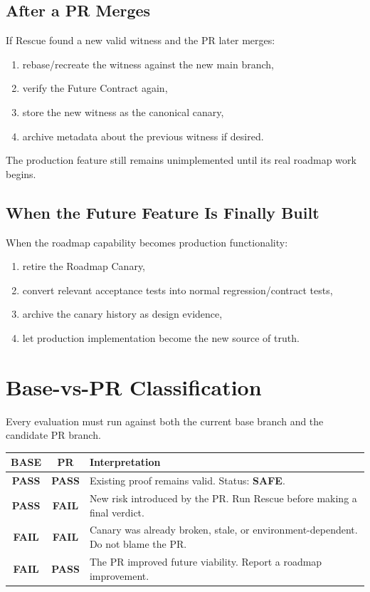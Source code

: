 \documentclass[12pt]{article}
\newcommand{\statussafe}{\textbf{\color{green}SAFE}}
\begin{document}
\subsection{After a PR Merges}

If Rescue found a new valid witness and the PR later merges:

\begin{enumerate}
    \item rebase/recreate the witness against the new main branch,
    \item verify the Future Contract again,
    \item store the new witness as the canonical canary,
    \item archive metadata about the previous witness if desired.
\end{enumerate}

The production feature still remains unimplemented until its real roadmap work begins.

\subsection{When the Future Feature Is Finally Built}

When the roadmap capability becomes production functionality:

\begin{enumerate}
    \item retire the Roadmap Canary,
    \item convert relevant acceptance tests into normal regression/contract tests,
    \item archive the canary history as design evidence,
    \item let production implementation become the new source of truth.
\end{enumerate}

\section{Base-vs-PR Classification}

Every evaluation must run against both the current base branch and the candidate PR branch.

\begin{center}
\renewcommand{\arraystretch}{1.3}
\begin{tabularx}{\textwidth}{>{\bfseries}c >{\bfseries}c X}
\toprule
BASE & PR & Interpretation \\
\midrule
PASS & PASS & Existing proof remains valid. Status: \statussafe. \\
PASS & FAIL & New risk introduced by the PR. Run Rescue before making a final verdict. \\
FAIL & FAIL & Canary was already broken, stale, or environment-dependent. Do not blame the PR. \\
FAIL & PASS & The PR improved future viability. Report a roadmap improvement. \\
\bottomrule
\end{tabularx}
\end{center}
\end{document}
